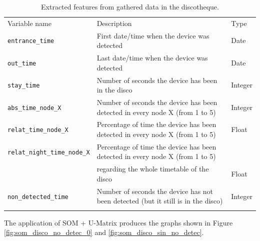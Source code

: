 \documentclass[preprint]{elsarticle}
\begin{document}
\begin{table}[htpb]
\centering
{\scriptsize
\begin{tabular}{lll}
\hline\noalign{\smallskip}
Variable name & Description & Type\\
\noalign{\smallskip}\hline\noalign{\smallskip}
\texttt{entrance\_time} & First date/time when the device was detected & Date\\
\texttt{out\_time} & Last date/time when the device was detected  & Date\\
\texttt{stay\_time} & Number of seconds the device has been in the disco & Integer\\
\texttt{abs\_time\_node\_X} & Number of seconds the device has been detected in every node X (from 1 to 5) & Integer\\
\texttt{relat\_time\_node\_X} & Percentage of time the device has been detected in every node X (from 1 to 5) & Float\\
\texttt{relat\_night\_time\_node\_X} & Percentage of time the device has been detected in every node X (from 1 to 5) &\\
& regarding the whole timetable of the disco & Float\\
\texttt{non\_detected\_time} & Number of seconds the device has not been detected (but it still is in the disco) & Integer\\
\noalign{\smallskip}\hline
\end{tabular}
 \caption{Extracted features from gathered data in the discotheque. \label{tab:features_disco}}
}
\end{table}


The application of SOM + U-Matrix produces the graphs shown in Figure \ref{fig:som_disco_no_detec_0} and \ref{fig:som_disco_sin_no_detec}.
\end{document}
